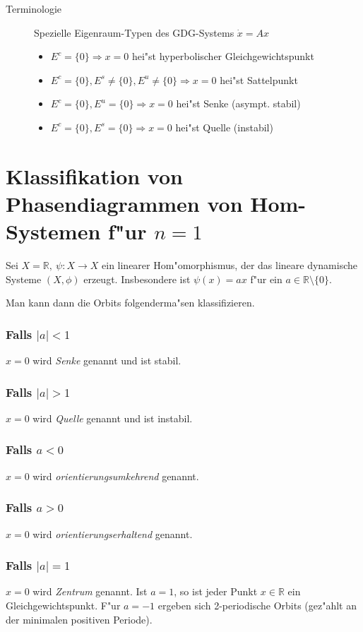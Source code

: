 \documentclass[a4paper, 13pt]{scrreprt}
\theoremstyle{definition} \newtheorem{definition}{Definition}[section]
\newcommand{\RR}{\mathbb{R}}
\begin{document}
\begin{description}
	\item[Terminologie]Spezielle Eigenraum-Typen des GDG-Systems $\dot x = Ax$ \\
	\begin{itemize}
		\item \(E^c = \{0\} \Rightarrow x =0\) hei"st hyperbolischer Gleichgewichtspunkt 
		\item \(E^c = \{0\}, {E^s \not= \{0\}, E^u \not= \{0\}} \Rightarrow x =0\) hei"st Sattelpunkt
		\item \(E^c = \{0\}, E^u = \{0\} \Rightarrow x =0\) hei"st Senke (asympt. stabil) 
		\item \(E^c = \{0\}, E^s = \{0\} \Rightarrow x =0\) hei"st Quelle (instabil)
		
	\end{itemize}
\end{description} 

\section{Klassifikation von Phasendiagrammen von Hom-Systemen f"ur $n=1$}

Sei $X = \RR, \ \psi\colon X \to X$ ein linearer Hom"omorphismus, der das lineare dynamische Systeme $(X,\phi)$ erzeugt. Insbesondere ist $\psi(x) = ax$ f"ur ein $a\in\RR\setminus\{0\}$.

Man kann dann die Orbits folgenderma"sen klassifizieren.
\subsubsection{Falls $|a| < 1$}
$x=0$ wird \emph{Senke} genannt und ist stabil.
\subsubsection{Falls $|a| > 1$}
$x=0$ wird \emph{Quelle} genannt und ist instabil.
\subsubsection{Falls $ a < 0$}
$x=0$ wird \emph{orientierungsumkehrend} genannt.
\subsubsection{Falls $a > 0$}
$x=0$ wird \emph{orientierungserhaltend} genannt.
\subsubsection{Falls $|a| = 1$}
$x=0$ wird \emph{Zentrum} genannt. Ist $a = 1$, so ist jeder Punkt $x\in\RR$ ein Gleichgewichtspunkt. F"ur $a=-1$ ergeben sich 2-periodische Orbits (gez"ahlt an der minimalen positiven Periode).
\end{document}
